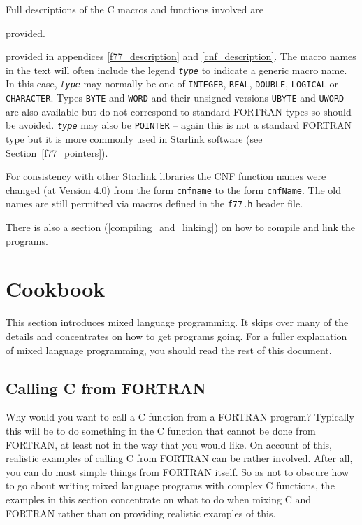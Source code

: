 \documentclass[twoside,11pt]{article}
\newcommand{\htmlref}[2]{#1}
\newcommand{\latex}[1]{#1}
\newcommand{\xlabel}[1]{}
\renewcommand{\_}{\texttt{\symbol{95}}}
\newcounter{examples}
\begin{document}
Full descriptions of the C
\htmlref{macros}{f77_description}
and 
\htmlref{functions}{cnf_description}
involved are
\begin{htmlonly}
provided.
\end{htmlonly}
\latex{provided in appendices \ref{f77_description} and 
\ref{cnf_description}.} The macro names in the text will often include the
legend \texttt{\textit{type}} to indicate a generic macro name. In this case,
\texttt{\textit{type}}\/ may normally be one of \texttt{INTEGER}, 
\texttt{REAL}, \texttt{DOUBLE}, \texttt{LOGICAL} or \texttt{CHARACTER}. 
Types \texttt{BYTE} and \texttt{WORD} and their unsigned versions 
\texttt{UBYTE} and \texttt{UWORD} are also available but do not correspond to 
standard FORTRAN types so should be avoided. 
\texttt{\textit{type}} may also be \texttt{POINTER} -- again this is not a 
standard FORTRAN type but it is more commonly 
\htmlref{used in Starlink software}
{f77_pointers}\latex{ (see Section~\ref{f77_pointers})}.

For consistency with other Starlink libraries the CNF function names were
changed (at Version 4.0) from the form \texttt{cnf\_name} to the form 
\texttt{cnfName}.
The old names are still permitted via macros defined in the \texttt{f77.h}
header file.

There is also a section \latex{(\ref{compiling_and_linking})} on
\htmlref{how to compile and link the programs}{compiling_and_linking}.


\section{\xlabel{cookbook}Cookbook}

This section 
introduces mixed language programming. It skips over many of the
details and concentrates on how to get programs going. For a fuller explanation
of mixed language programming, you should read the rest of this document.

\subsection{\xlabel{calling_c_from_fortran}\label{cook_f2c}Calling C from FORTRAN}

Why would you want to call a C function from a FORTRAN program? Typically this
will be to do something in the C function that cannot be done from FORTRAN, at
least not in the way that you would like. On account of this, realistic
examples of calling C from FORTRAN can be rather involved. After all, you can
do most simple things from FORTRAN itself. So as not to obscure how to go about
writing mixed language programs with complex C functions, the examples in this
section concentrate on what to do when mixing C and FORTRAN rather than on
providing realistic examples of this.
\end{document}
